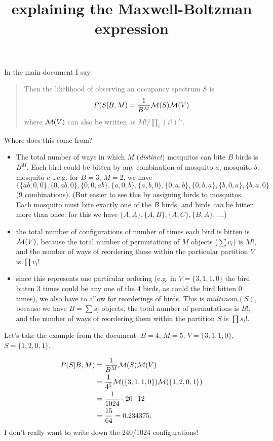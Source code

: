 \documentclass{article}
\title{explaining the Maxwell-Boltzman expression}
\newcommand{\multinom}{{\cal M}}
\begin{document}
In the main document I say

\begin{quote}
Then the likelihood of observing an occupancy spectrum $S$ is
\begin{equation}
P(S|B,M) =  \frac{1}{B^M} \multinom(S) \multinom(V)
\end{equation}
where $\multinom(V)$ can also be written as
$M!/\prod_i (i!)^{s_i}$.
\end{quote}

Where does this come from?

\begin{itemize}
\item The total number of ways in which $M$ (\emph{distinct})
mosquitos can bite $B$ birds is $B^M$. Each bird could be bitten
by any combination of mosquito $a$, mosquito $b$, mosquito $c$ 
\ldots e.g. for $B=3$, $M=2$, we have 
$\{\{ab,0,0\}, \{0,ab,0\}, \{0,0,ab\}, \{a,0,b\},\{a,b,0\},
\{0,a,b\},\{0,b,a\},\{b,0,a\},\{b,a,0\}$ (9 combinations).
(But easier to see this by assigning birds to mosquitos. Each
mosquito must bite exactly one of the $B$ birds, and birds \emph{can}
be bitten more than once: for this we have $\{A,A\},\{A,B\},\{A,C\},
\{B,A\}, \ldots$.)
\item the total number of configurations of number of times each
bird is bitten is $\multinom(V)$, because the total number of permutations
of $M$ objects ($\sum v_i$) is $M!$, and the number of ways of
reordering those within the particular partition $V$ is
$\prod v_i!$
\item since this represents one particular ordering (e.g. in 
$V=\{3,1,1,0\}$ the bird bitten 3 times could be any one of the
4 birds, as could the bird bitten 0 times), we also have to allow
for reorderings of birds. This is $multinom(S)$, because we have
$B=\sum s_i$ objects, the total number of permutations is $B!$,
and the number of ways of reordering them within the partition $S$
is $\prod s_i!$.
\end{itemize}

Let's take the example from the document. $B=4$, $M=5$, 
$V=\{3,1,1,0\}$, $S=\{1,2,0,1\}$.

\begin{equation*}
\begin{split}
P(S|B,M) & =  \frac{1}{B^M} \multinom(S) \multinom(V) \\
         & =  \frac{1}{4^5} \multinom(\{3,1,1,0\}) \multinom(\{1,2,0,1\}) \\
         & =  \frac{1}{1024} \cdot 20 \cdot 12 \\
         & =  \frac{15}{64} = 0.234375.
\end{split}
\end{equation*}
I don't really want to write down the 240/1024 configurations!
\end{document}
